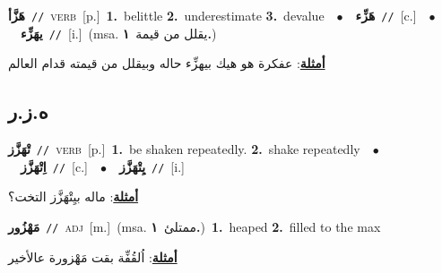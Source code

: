 \documentclass[10pt,a4paper,twoside]{article} %
\begin{document}
\begin{multicols}{2}
{\setlength\topsep{0pt}\textbf{\foreignlanguage{arabic}{هَزَّأ}}\ {\color{gray}\texttt{//}\color{black}}\ \textsc{verb}\ [p.]\ \textbf{1.}~belittle  \textbf{2.}~underestimate  \textbf{3.}~devalue\ \ $\bullet$\ \ \setlength\topsep{0pt}\textbf{\foreignlanguage{arabic}{هَزِّء}}\ {\color{gray}\texttt{//}\color{black}}\ [c.]\ \ $\bullet$\ \ \setlength\topsep{0pt}\textbf{\foreignlanguage{arabic}{يهَزِّء}}\ {\color{gray}\texttt{//}\color{black}}\ [i.]\ \color{gray}(msa. \foreignlanguage{arabic}{يقلل من قيمة}~\foreignlanguage{arabic}{\textbf{١.}})\color{black}\  \begin{flushright}\color{gray}\foreignlanguage{arabic}{\textbf{\underline{\foreignlanguage{arabic}{أمثلة}}}: عفكرة هو هيك بيهزِّء حاله وبيقلل من قيمته قدام العالم}\end{flushright}\color{black}} \vspace{2mm}

\vspace{-3mm}
\subsection*{\color{blue}\foreignlanguage{arabic}{ه.ز.ر}\color{blue}{}} 

{\setlength\topsep{0pt}\textbf{\foreignlanguage{arabic}{تْهَزَّز}}\ {\color{gray}\texttt{//}\color{black}}\ \textsc{verb}\ [p.]\ \textbf{1.}~be shaken repeatedly.  \textbf{2.}~shake repeatedly\ \ $\bullet$\ \ \setlength\topsep{0pt}\textbf{\foreignlanguage{arabic}{اِتْهَزَّز}}\ {\color{gray}\texttt{//}\color{black}}\ [c.]\ \ $\bullet$\ \ \setlength\topsep{0pt}\textbf{\foreignlanguage{arabic}{يِتْهَزَّز}}\ {\color{gray}\texttt{//}\color{black}}\ [i.]\  \begin{flushright}\color{gray}\foreignlanguage{arabic}{\textbf{\underline{\foreignlanguage{arabic}{أمثلة}}}: ماله بيِتْهَزَّز التخت؟}\end{flushright}\color{black}} \vspace{2mm}

{\setlength\topsep{0pt}\textbf{\foreignlanguage{arabic}{مَهْزُور}}\ {\color{gray}\texttt{//}\color{black}}\ \textsc{adj}\ [m.]\ \color{gray}(msa. \foreignlanguage{arabic}{ممتلئ}~\foreignlanguage{arabic}{\textbf{١.}})\color{black}\ \textbf{1.}~heaped  \textbf{2.}~filled to the max\  \begin{flushright}\color{gray}\foreignlanguage{arabic}{\textbf{\underline{\foreignlanguage{arabic}{أمثلة}}}: اُلقُفِّة بقت مَهْزورة عالأخير}\end{flushright}\color{black}} \vspace{2mm}


\end{multicols}
\end{document}
